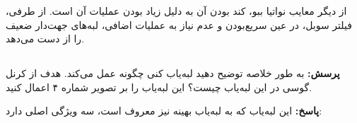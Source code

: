 \documentclass[12pt,a4paper]{article}
\theoremstyle{definition}
\theoremstyle{theorem}
\theoremstyle{definition}
\begin{document}
\begin{center}
\vspace{0.2cm}
\end{center}

از دیگر معایب نواتیا ببو، کند بودن آن به دلیل زیاد بودن عملیات آن است.
از طرفی، فیلتر سوبل، در عین سریع‌بودن و عدم نیاز به عملیات اضافی، لبه‌های جهت‌دار ضعیف را از دست می‌دهد.

\subsection{}

\textbf{پرسش: }
به طور خلاصه توضیح دهید لبه‌یاب کنی چگونه عمل می‌کند. هدف از کرنل گوسی در این لبه‌یاب چیست؟ این لبه‌یاب را بر تصویر شماره ۴ اعمال کنید.


\textbf{پاسخ: } 
این لبه‌یاب که به لبه‌یاب بهینه نیز معروف است،‌ سه ویژگی اصلی دارد: 
\end{document}
